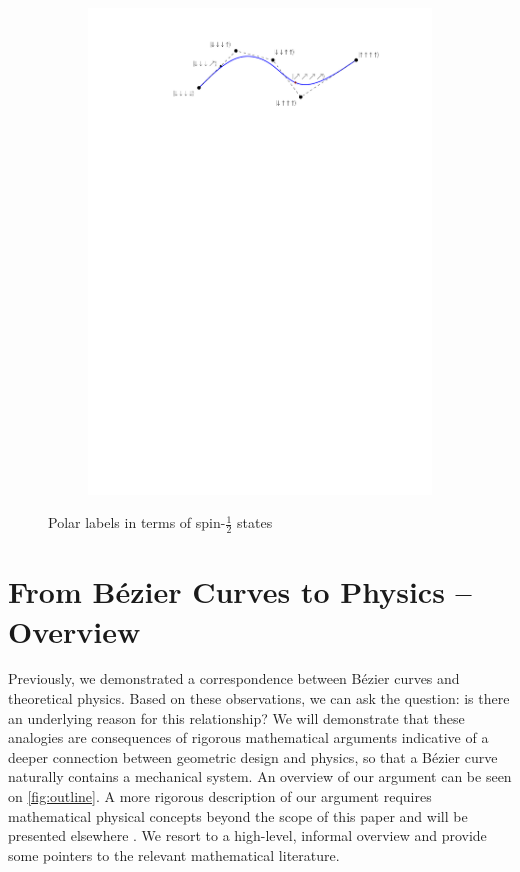 \documentclass[12pt,final,3p]{elsarticle}
\begin{document}
\begin{figure}[h]
	\centering
	\begin{subfigure}{0.6\textwidth}
		\includegraphics[width=\textwidth, keepaspectratio]{figures/polarform_spin.pdf}
	\end{subfigure}
	\caption{Polar labels in terms of spin-$\frac{1}{2}$ states}
	\label{fig:polarform_spin}
\end{figure}

\section{From B\'{e}zier Curves to Physics -- Overview}\label{sec:bezier2physics}
Previously, we demonstrated a correspondence between B\'{e}zier curves and theoretical physics. Based on these observations, we can ask the question: is there an underlying reason for this relationship? We will demonstrate that these analogies are consequences of rigorous mathematical arguments indicative of a deeper connection between geometric design and physics, so that a B\'{e}zier curve naturally contains a mechanical system. An overview of our argument can be seen on \autoref{fig:outline}. A more rigorous description of   our argument requires mathematical physical concepts beyond the scope of this paper and will be presented elsewhere \cite{vaitkus2018physics}. We resort to a high-level, informal overview and provide some pointers to the relevant mathematical literature.
\end{document}
